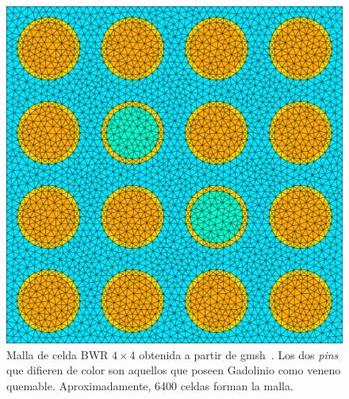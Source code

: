 \documentclass[11pt]{article}
\numberwithin{equation}{section}
\begin{document}
\begin{figure}[!ht]
 \begin{center}
  \includegraphics[width=0.55\linewidth]{graficos/bwr-gadolinio/bwr-gadolinio.pdf}
 \end{center}
\caption{\label{fig:bwr-mesh} Malla de celda BWR $\num{4} \times \num{4}$ obtenida a partir de gmsh~\cite{gmsh}. Los dos \emph{pins} que difieren de color son aquellos que poseen Gadolinio como veneno quemable. Aproximadamente, \num{6400} celdas forman la malla.}
\end{figure}
\end{document}
